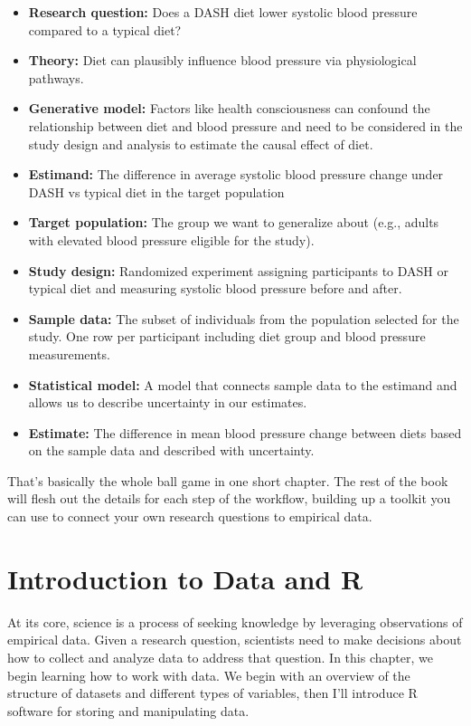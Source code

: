 \documentclass[
]{book}
\providecommand{\tightlist}{%
  \setlength{\itemsep}{0pt}\setlength{\parskip}{0pt}}
\begin{document}
\begin{itemize}
\tightlist
\item
  \textbf{Research question:} Does a DASH diet lower systolic blood pressure compared to a typical diet?
\item
  \textbf{Theory:} Diet can plausibly influence blood pressure via physiological pathways.
\item
  \textbf{Generative model:} Factors like health consciousness can confound the relationship between diet and blood pressure and need to be considered in the study design and analysis to estimate the causal effect of diet.
\item
  \textbf{Estimand:} The difference in average systolic blood pressure change under DASH vs typical diet in the target population
\item
  \textbf{Target population:} The group we want to generalize about (e.g., adults with elevated blood pressure eligible for the study).
\item
  \textbf{Study design:} Randomized experiment assigning participants to DASH or typical diet and measuring systolic blood pressure before and after.
\item
  \textbf{Sample data:} The subset of individuals from the population selected for the study. One row per participant including diet group and blood pressure measurements.
\item
  \textbf{Statistical model:} A model that connects sample data to the estimand and allows us to describe uncertainty in our estimates.
\item
  \textbf{Estimate:} The difference in mean blood pressure change between diets based on the sample data and described with uncertainty.
\end{itemize}

That's basically the whole ball game in one short chapter. The rest of the book will flesh out the details for each step of the workflow, building up a toolkit you can use to connect your own research questions to empirical data.

\chapter{Introduction to Data and R}\label{introduction-to-data-and-r}

At its core, science is a process of seeking knowledge by leveraging observations of empirical data. Given a research question, scientists need to make decisions about how to collect and analyze data to address that question. In this chapter, we begin learning how to work with data. We begin with an overview of the structure of datasets and different types of variables, then I'll introduce R software for storing and manipulating data.
\end{document}
